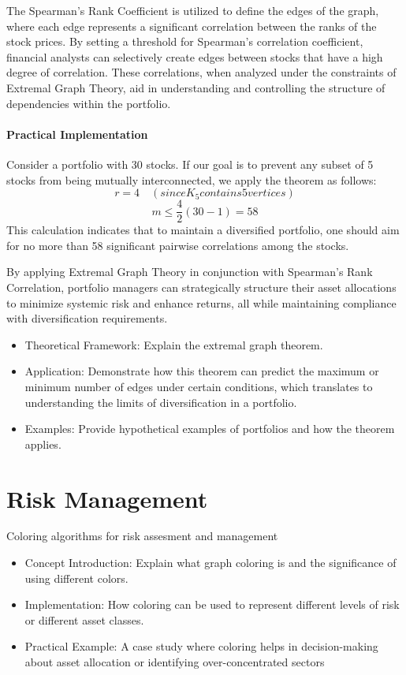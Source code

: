 \documentclass{article}
\begin{document}
The Spearman's Rank Coefficient is utilized to define the edges of the graph, where each edge represents a significant correlation between the ranks of the stock prices. By setting a threshold for Spearman's correlation coefficient, financial analysts can selectively create edges between stocks that have a high degree of correlation. These correlations, when analyzed under the constraints of Extremal Graph Theory, aid in understanding and controlling the structure of dependencies within the portfolio.

\paragraph{Practical Implementation}
Consider a portfolio with 30 stocks. If our goal is to prevent any subset of 5 stocks from being mutually interconnected, we apply the theorem as follows:
\[
r = 4 \quad ({since } K_5 {contains 5 vertices})
\]
\[
m \leq \frac{4}{2} (30-1) = 58
\]
This calculation indicates that to maintain a diversified portfolio, one should aim for no more than 58 significant pairwise correlations among the stocks.

By applying Extremal Graph Theory in conjunction with Spearman's Rank Correlation, portfolio managers can strategically structure their asset allocations to minimize systemic risk and enhance returns, all while maintaining compliance with diversification requirements.

\begin{itemize}
    \item Theoretical Framework: Explain the extremal graph theorem.
    \item Application: Demonstrate how this theorem can predict the maximum or minimum number of edges under certain conditions, which translates to understanding the limits of diversification in a portfolio.
    \item Examples: Provide hypothetical examples of portfolios and how the theorem applies.
\end{itemize}


\section{Risk Management}
Coloring algorithms for risk assesment and management

\begin{itemize}
    \item Concept Introduction: Explain what graph coloring is and the significance of using different colors.
    \item Implementation: How coloring can be used to represent different levels of risk or different asset classes.
    \item Practical Example: A case study where coloring helps in decision-making about asset allocation or identifying over-concentrated sectors
\end{itemize}
\end{document}
